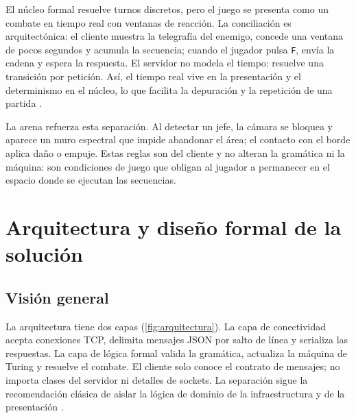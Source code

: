 \documentclass[9pt]{ieeeconf}
\begin{document}
El núcleo formal resuelve turnos discretos, pero el juego se presenta como un combate en tiempo real con ventanas de reacción. La conciliación es arquitectónica: el cliente muestra la telegrafía del enemigo, concede una ventana de pocos segundos y acumula la secuencia; cuando el jugador pulsa \texttt{F}, envía la cadena y espera la respuesta. El servidor no modela el tiempo: resuelve una transición por petición. Así, el tiempo real vive en la presentación y el determinismo en el núcleo, lo que facilita la depuración y la repetición de una partida \cite{gregory2018}.

La arena refuerza esta separación. Al detectar un jefe, la cámara se bloquea y aparece un muro espectral que impide abandonar el área; el contacto con el borde aplica daño o empuje. Estas reglas son del cliente y no alteran la gramática ni la máquina: son condiciones de juego que obligan al jugador a permanecer en el espacio donde se ejecutan las secuencias.


\section{Arquitectura y diseño formal de la solución}
\label{sec:arquitectura}

\subsection{Visión general}
\label{sec:vision}

La arquitectura tiene dos capas (\cref{fig:arquitectura}). La capa de conectividad acepta conexiones TCP, delimita mensajes JSON por salto de línea y serializa las respuestas. La capa de lógica formal valida la gramática, actualiza la máquina de Turing y resuelve el combate. El cliente solo conoce el contrato de mensajes; no importa clases del servidor ni detalles de sockets. La separación sigue la recomendación clásica de aislar la lógica de dominio de la infraestructura y de la presentación \cite{gregory2018,nystrom2014}.
\end{document}
